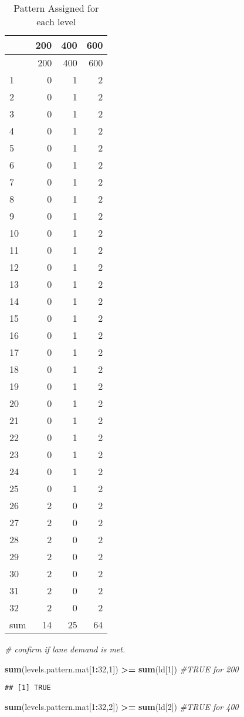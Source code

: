 \documentclass[
]{article}
\newenvironment{Shaded}{\begin{snugshade}}{\end{snugshade}}
\newcommand{\CommentTok}[1]{\textcolor[rgb]{0.56,0.35,0.01}{\textit{#1}}}
\newcommand{\DecValTok}[1]{\textcolor[rgb]{0.00,0.00,0.81}{#1}}
\newcommand{\KeywordTok}[1]{\textcolor[rgb]{0.13,0.29,0.53}{\textbf{#1}}}
\newcommand{\NormalTok}[1]{#1}
\newcommand{\OperatorTok}[1]{\textcolor[rgb]{0.81,0.36,0.00}{\textbf{#1}}}
\newcommand{\StringTok}[1]{\textcolor[rgb]{0.31,0.60,0.02}{#1}}
\begin{document}
\begin{longtable}[]{@{}lrrr@{}}
\caption{Pattern Assigned for each level}\tabularnewline
\toprule
& 200 & 400 & 600\tabularnewline
\midrule
\endfirsthead
\toprule
& 200 & 400 & 600\tabularnewline
\midrule
\endhead
1 & 0 & 1 & 2\tabularnewline
2 & 0 & 1 & 2\tabularnewline
3 & 0 & 1 & 2\tabularnewline
4 & 0 & 1 & 2\tabularnewline
5 & 0 & 1 & 2\tabularnewline
6 & 0 & 1 & 2\tabularnewline
7 & 0 & 1 & 2\tabularnewline
8 & 0 & 1 & 2\tabularnewline
9 & 0 & 1 & 2\tabularnewline
10 & 0 & 1 & 2\tabularnewline
11 & 0 & 1 & 2\tabularnewline
12 & 0 & 1 & 2\tabularnewline
13 & 0 & 1 & 2\tabularnewline
14 & 0 & 1 & 2\tabularnewline
15 & 0 & 1 & 2\tabularnewline
16 & 0 & 1 & 2\tabularnewline
17 & 0 & 1 & 2\tabularnewline
18 & 0 & 1 & 2\tabularnewline
19 & 0 & 1 & 2\tabularnewline
20 & 0 & 1 & 2\tabularnewline
21 & 0 & 1 & 2\tabularnewline
22 & 0 & 1 & 2\tabularnewline
23 & 0 & 1 & 2\tabularnewline
24 & 0 & 1 & 2\tabularnewline
25 & 0 & 1 & 2\tabularnewline
26 & 2 & 0 & 2\tabularnewline
27 & 2 & 0 & 2\tabularnewline
28 & 2 & 0 & 2\tabularnewline
29 & 2 & 0 & 2\tabularnewline
30 & 2 & 0 & 2\tabularnewline
31 & 2 & 0 & 2\tabularnewline
32 & 2 & 0 & 2\tabularnewline
sum & 14 & 25 & 64\tabularnewline
\bottomrule
\end{longtable}

\begin{Shaded}
\begin{Highlighting}[]
\CommentTok{# confirm if lane demand is met.}

\KeywordTok{sum}\NormalTok{(levels.pattern.mat[}\DecValTok{1}\OperatorTok{:}\DecValTok{32}\NormalTok{,}\DecValTok{1}\NormalTok{]) }\OperatorTok{>=}\StringTok{ }\KeywordTok{sum}\NormalTok{(ld[}\DecValTok{1}\NormalTok{]) }\CommentTok{#TRUE  for 200}
\end{Highlighting}
\end{Shaded}

\begin{verbatim}
## [1] TRUE
\end{verbatim}

\begin{Shaded}
\begin{Highlighting}[]
\KeywordTok{sum}\NormalTok{(levels.pattern.mat[}\DecValTok{1}\OperatorTok{:}\DecValTok{32}\NormalTok{,}\DecValTok{2}\NormalTok{]) }\OperatorTok{>=}\StringTok{ }\KeywordTok{sum}\NormalTok{(ld[}\DecValTok{2}\NormalTok{]) }\CommentTok{#TRUE  for 400}
\end{Highlighting}
\end{Shaded}
\end{document}
